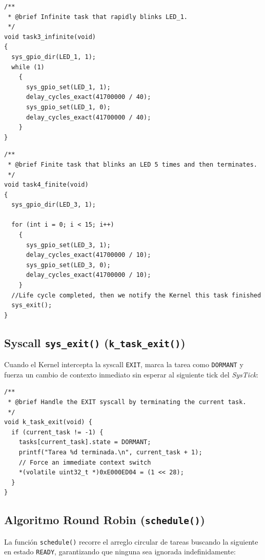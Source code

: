 \documentclass[12pt,letterpaper]{article}
\begin{document}
\begin{lstlisting}[style=modernc, caption={Tarea infinita: parpadeo rápido de LED en \texttt{task3\_infinite()}}]
/**
 * @brief Infinite task that rapidly blinks LED_1.
 */
void task3_infinite(void)
{
  sys_gpio_dir(LED_1, 1);
  while (1)
    {
      sys_gpio_set(LED_1, 1);
      delay_cycles_exact(41700000 / 40);
      sys_gpio_set(LED_1, 0);
      delay_cycles_exact(41700000 / 40);
    }
}
\end{lstlisting}
 
\begin{lstlisting}[style=modernc, caption={Tarea finita: 15 parpadeos y \texttt{sys\_exit()} en \texttt{task4\_finite()}}]
/**
 * @brief Finite task that blinks an LED 5 times and then terminates.
 */
void task4_finite(void)
{
  sys_gpio_dir(LED_3, 1);
  
  for (int i = 0; i < 15; i++)
    {
      sys_gpio_set(LED_3, 1);
      delay_cycles_exact(41700000 / 10);
      sys_gpio_set(LED_3, 0);
      delay_cycles_exact(41700000 / 10);
    }
  //Life cycle completed, then we notify the Kernel this task finished
  sys_exit();
}
\end{lstlisting}
 
\subsection*{Syscall \texttt{sys\_exit()} (\texttt{k\_task\_exit()})}
Cuando el Kernel intercepta la syscall \texttt{EXIT}, marca la tarea como \texttt{DORMANT} y fuerza un cambio de contexto inmediato sin esperar al siguiente tick del \textit{SysTick}:
 
\begin{lstlisting}[style=modernc, caption={Gestión del fin de tarea en \texttt{k\_task\_exit()}}]
/**
 * @brief Handle the EXIT syscall by terminating the current task.
 */
void k_task_exit(void) {
  if (current_task != -1) {
    tasks[current_task].state = DORMANT;
    printf("Tarea %d terminada.\n", current_task + 1);
    // Force an immediate context switch
    *(volatile uint32_t *)0xE000ED04 = (1 << 28);
  }
}
\end{lstlisting}
 
\subsection*{Algoritmo Round Robin (\texttt{schedule()})}
La función \texttt{schedule()} recorre el arreglo circular de tareas buscando la
siguiente en estado \texttt{READY}, garantizando que ninguna sea ignorada
indefinidamente:
 
\end{document}
